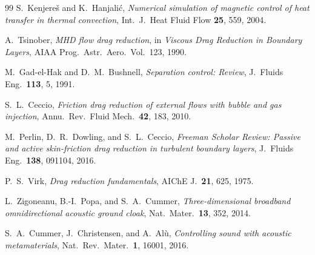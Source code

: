 \documentclass[12pt,twocolumn]{article}
\begin{document}
\begin{thebibliography}{99}
S.~Kenjere\v{s} and K.~Hanjali\'{c}, \emph{Numerical simulation of
magnetic control of heat transfer in thermal convection},
Int.~J.~Heat Fluid Flow \textbf{25}, 559, 2004.

A.~Tsinober, \emph{MHD flow drag reduction}, in
\textit{Viscous Drag Reduction in Boundary Layers},
AIAA Prog.~Astr.~Aero.~Vol.~123, 1990.

M.~Gad-el-Hak and D.~M.~Bushnell, \emph{Separation control: Review},
J.~Fluids Eng.~\textbf{113}, 5, 1991.

S.~L.~Ceccio, \emph{Friction drag reduction of external flows with
bubble and gas injection},
Annu.~Rev.~Fluid Mech.~\textbf{42}, 183, 2010.

M.~Perlin, D.~R.~Dowling, and S.~L.~Ceccio, \emph{Freeman Scholar Review:
Passive and active skin-friction drag reduction in turbulent boundary
layers}, J.~Fluids Eng.~\textbf{138}, 091104, 2016.

P.~S.~Virk, \emph{Drag reduction fundamentals},
AIChE J.~\textbf{21}, 625, 1975.

L.~Zigoneanu, B.-I.~Popa, and S.~A.~Cummer, \emph{Three-dimensional
broadband omnidirectional acoustic ground cloak},
Nat.~Mater.~\textbf{13}, 352, 2014.

S.~A.~Cummer, J.~Christensen, and A.~Al\`{u}, \emph{Controlling sound
with acoustic metamaterials}, Nat.~Rev.~Mater.~\textbf{1}, 16001, 2016.

\end{thebibliography}
\end{document}
